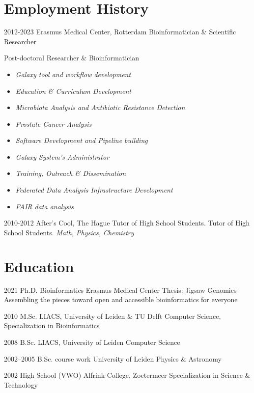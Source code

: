 \documentclass[]{shiltemann-cv}
\begin{document}
\section{Employment History}

\begin{entrylist}
 \entry
    {2012-2023}
    {Erasmus Medical Center, Rotterdam}
    {Bioinformatician \& Scientific Researcher}
    {Post-doctoral Researcher \& Bioinformatician
     \begin{itemize}
       \item \emph{Galaxy tool and workflow development}
       \item \emph{Education \& Curriculum Development}
       \item \emph{Microbiota Analysis and Antibiotic Resistance Detection}
       \item \emph{Prostate Cancer Analysis}
       \item \emph{Software Development and Pipeline building}
       \item \emph{Galaxy System's Administrator}
       \item \emph{Training, Outreach \& Dissemination}
       \item \emph{Federated Data Analysis Infrastructure Development}
       \item \emph{FAIR data analysis}
     \end{itemize}}
  \entry
    {2010-2012}
    {After's Cool, The Hague}
    {Tutor of High School Students.}
    {Tutor of High School Students. \emph{Math, Physics, Chemistry}}
\end{entrylist}


\section{Education}

\begin{entrylist}
  \entry
    {2021}
    {Ph.D. Bioinformatics}
    {Erasmus Medical Center}
    {Thesis: Jigsaw Genomics Assembling the pieces toward open and accessible bioinformatics for everyone}
\end{entrylist}
\begin{entrylist}


  \entry
    {2010}
    {M.Sc.}
    {LIACS, University of Leiden \& TU Delft}
    {Computer Science, Specialization in Bioinformatics}

\end{entrylist}
\begin{entrylist}

  \entry
    {2008}
    {B.Sc.}
    {LIACS, University of Leiden}
    {Computer Science}
\end{entrylist}
\begin{entrylist}


  \entry
    {2002–2005}
    {B.Sc. course work}
    {University of Leiden}
    {Physics \& Astronomy}
\end{entrylist}
\begin{entrylist}


  \entry
    {2002}
    {High School (VWO)}
    {Alfrink College, Zoetermeer}
    {Specialization in Science \& Technology}
\end{entrylist}
\end{document}
